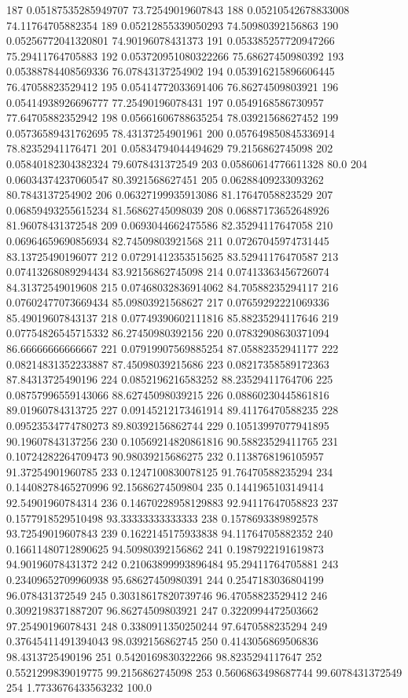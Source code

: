{187 0.05187535285949707 73.72549019607843
188 0.05210542678833008 74.11764705882354
189 0.05212855339050293 74.50980392156863
190 0.05256772041320801 74.90196078431373
191 0.053385257720947266 75.29411764705883
192 0.053720951080322266 75.68627450980392
193 0.05388784408569336 76.07843137254902
194 0.053916215896606445 76.47058823529412
195 0.05414772033691406 76.86274509803921
196 0.05414938926696777 77.25490196078431
197 0.0549168586730957 77.64705882352942
198 0.05661606788635254 78.03921568627452
199 0.05736589431762695 78.43137254901961
200 0.057649850845336914 78.82352941176471
201 0.05834794044494629 79.2156862745098
202 0.05840182304382324 79.6078431372549
203 0.05860614776611328 80.0
204 0.06034374237060547 80.3921568627451
205 0.06288409233093262 80.7843137254902
206 0.06327199935913086 81.17647058823529
207 0.06859493255615234 81.56862745098039
208 0.06887173652648926 81.96078431372548
209 0.0693044662475586 82.35294117647058
210 0.06964659690856934 82.74509803921568
211 0.07267045974731445 83.13725490196077
212 0.07291412353515625 83.52941176470587
213 0.07413268089294434 83.92156862745098
214 0.07413363456726074 84.31372549019608
215 0.07468032836914062 84.70588235294117
216 0.07602477073669434 85.09803921568627
217 0.07659292221069336 85.49019607843137
218 0.07749390602111816 85.88235294117646
219 0.07754826545715332 86.27450980392156
220 0.07832908630371094 86.66666666666667
221 0.07919907569885254 87.05882352941177
222 0.08214831352233887 87.45098039215686
223 0.08217358589172363 87.84313725490196
224 0.0852196216583252 88.23529411764706
225 0.08757996559143066 88.62745098039215
226 0.08860230445861816 89.01960784313725
227 0.09145212173461914 89.41176470588235
228 0.09523534774780273 89.80392156862744
229 0.10513997077941895 90.19607843137256
230 0.10569214820861816 90.58823529411765
231 0.10724282264709473 90.98039215686275
232 0.1138768196105957 91.37254901960785
233 0.1247100830078125 91.76470588235294
234 0.14408278465270996 92.15686274509804
235 0.1441965103149414 92.54901960784314
236 0.14670228958129883 92.94117647058823
237 0.1577918529510498 93.33333333333333
238 0.1578693389892578 93.72549019607843
239 0.1622145175933838 94.11764705882352
240 0.16611480712890625 94.50980392156862
241 0.1987922191619873 94.90196078431372
242 0.21063899993896484 95.29411764705881
243 0.23409652709960938 95.68627450980391
244 0.2547183036804199 96.078431372549
245 0.30318617820739746 96.47058823529412
246 0.3092198371887207 96.86274509803921
247 0.3220994472503662 97.25490196078431
248 0.3380911350250244 97.6470588235294
249 0.37645411491394043 98.0392156862745
250 0.4143056869506836 98.4313725490196
251 0.5420169830322266 98.8235294117647
252 0.5521299839019775 99.2156862745098
253 0.5606863498687744 99.6078431372549
254 1.7733676433563232 100.0
}\tableexpivecdfrlactcrizodb
